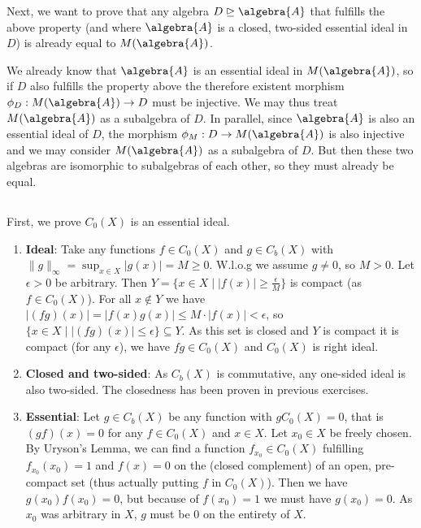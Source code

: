 \documentclass[a4paper]{article}
\begin{document}
Next, we want to prove that any algebra $D \trianglerighteq \algebra{A}$ that fulfills the above property (and where $\algebra{A}$ is a closed, two-sided essential ideal in $D$) is already equal to $M(\algebra{A})$.

We already know that $\algebra{A}$ is an essential ideal in $M(\algebra{A})$, so if $D$ also fulfills the property above the therefore existent morphism $\phi_D: M(\algebra{A}) \to D$ must be injective.
We may thus treat $M(\algebra{A})$ as a subalgebra of $D$.
In parallel, since $\algebra{A}$ is also an essential ideal of $D$, the morphism $\phi_M: D \to M(\algebra{A})$ is also injective and we may consider $M(\algebra{A})$ as a subalgebra of $D$.
But then these two algebras are isomorphic to subalgebras of each other, so they must already be equal.

\subsection{}

First, we prove $C_0(X)$ is an essential ideal.

\begin{enumerate}
    \item \textbf{Ideal}: Take any functions $f \in C_0(X)$ and $g \in C_b(X)$ with $\|g\|_{\infty} = \sup_{x \in X} |g(x)| = M \geq 0 $.
    W.l.o.g we assume $g \neq 0$, so $M > 0$.
    Let $\epsilon > 0$ be arbitrary. Then $Y = \{ x \in X \mid |f(x)| \geq \frac{\epsilon}{M} \}$ is compact (as $f \in C_0(X)$). For all $x \notin Y$ we have $|(fg)(x)| = |f(x) g(x)| \leq M \cdot |f(x)| < \epsilon$, so $\{ x \in X \mid |(fg)(x)| \leq \epsilon \} \subseteq Y$.
    As this set is closed and $Y$ is compact it is compact (for any $\epsilon$), we have $fg \in C_0(X)$ and $C_0(X)$ is right ideal.
    \item \textbf{Closed and two-sided}: As $C_b(X)$ is commutative, any one-sided ideal is also two-sided. The closedness has been proven in previous exercises.
    \item \textbf{Essential}: Let $g \in C_b(X)$ be any function with $g C_0(X) = 0$, that is $(gf)(x) = 0$ for any $f \in C_0(X)$ and $x \in X$.
    Let $x_0 \in X$ be freely chosen. By Uryson's Lemma, we can find a function $f_{x_0} \in C_0(X)$ fulfilling $f_{x_0}(x_0) = 1$ and $f(x) = 0$ on the (closed complement) of an open, pre-compact set (thus actually putting $f$ in $C_0(X)$).
    Then we have $g(x_0) f(x_0) = 0$, but because of $f(x_0) =1 $ we must have $g(x_0) = 0$.
    As $x_0$ was arbitrary in $X$, $g$ must be $0$ on the entirety of $X$.
 \end{enumerate}
\end{document}
